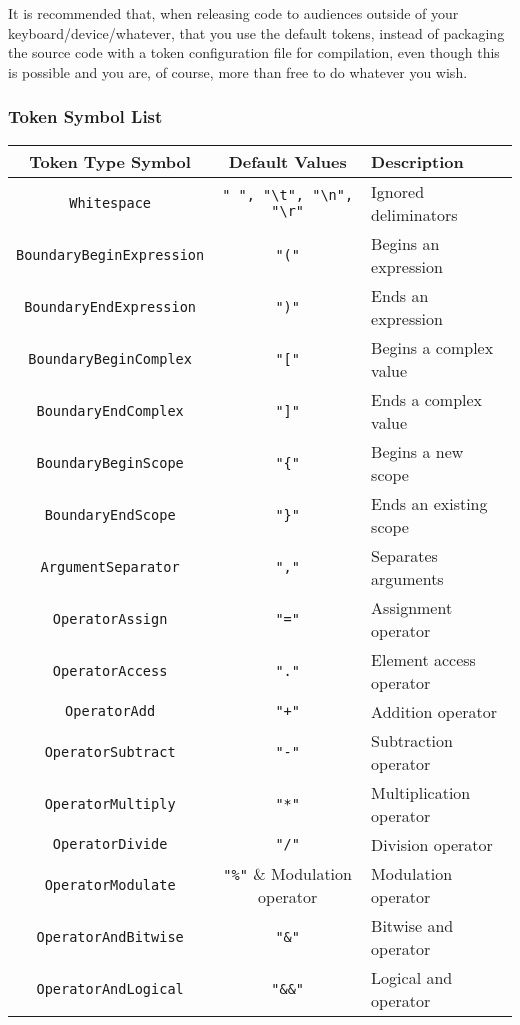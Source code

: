 \documentclass[10pt,a4paper]{article}
\begin{document}
It is recommended that, when releasing code to audiences outside of your keyboard/device/whatever, that you use the default tokens, instead of packaging the source code with a token configuration file for compilation, even though this is possible and you are, of course, more than free to do whatever you wish. 

\subsubsection{Token Symbol List}
\label{sec:tokenSymbolList}
\begin{center}
\begin{tabular}{|c|c|l|}
\hline
Token Type Symbol & Default Values & Description \\
\hline
\hline
\verb|Whitespace| & \verb|" ", "\t", "\n", "\r"| & Ignored deliminators \\
\hline
\verb|BoundaryBeginExpression| & \verb|"("| & Begins an expression \\
\hline
\verb|BoundaryEndExpression| & \verb|")"| & Ends an expression \\
\hline
\verb|BoundaryBeginComplex| & \verb|"["| & Begins a complex value \\
\hline
\verb|BoundaryEndComplex| & \verb|"]"| & Ends a complex value \\
\hline
\verb|BoundaryBeginScope| & \verb|"{"| & Begins a new scope \\
\hline
\verb|BoundaryEndScope| & \verb|"}"| & Ends an existing scope \\
\hline
\verb|ArgumentSeparator| & \verb|","| & Separates arguments \\
\hline
\verb|OperatorAssign| & \verb|"="| & Assignment operator \\
\hline
\verb|OperatorAccess| & \verb|"."| & Element access operator \\
\hline
\verb|OperatorAdd| & \verb|"+"| & Addition operator \\
\hline
\verb|OperatorSubtract| & \verb|"-"| & Subtraction operator \\
\hline
\verb|OperatorMultiply| & \verb|"*"| & Multiplication operator \\
\hline
\verb|OperatorDivide| & \verb|"/"| & Division operator \\
\hline
\verb|OperatorModulate| & \verb|"%"| & Modulation operator \\
\hline
\verb|OperatorAndBitwise| & \verb|"&"| & Bitwise and operator \\
\hline
\verb|OperatorAndLogical| & \verb|"&&"| & Logical and operator \\

\end{tabular}
\end{center}
\end{document}
